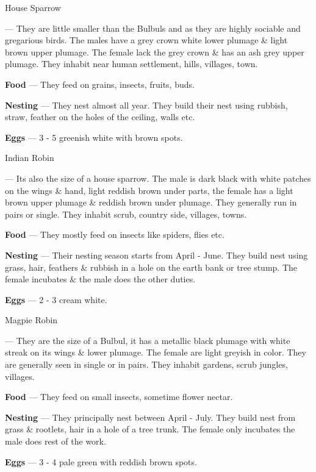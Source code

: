 \begin{bird}{House Sparrow}

 --- They are little smaller than the Bulbuls and as they are highly sociable and gregarious birds. The males have a grey crown white lower plumage \& light brown upper plumage. The female lack the grey crown \& has an ash grey upper plumage. They inhabit near human settlement, hills, villages, town. 

{\large\bf Food} --- They feed on grains, insects, fruits, buds.

{\large\bf Nesting} --- They nest almost all year. They build their nest using rubbish, straw, feather on the holes of the ceiling, walls etc.

{\large\bf Eggs} --- 3 - 5 greenish white with brown spots.
\end{bird}

\begin{bird}{Indian Robin}

 --- Its also the size of a house sparrow. The male is dark black with white patches on the wings \& hand, light reddish brown under parts, the female has a light brown upper plumage \& reddish brown under plumage. They generally run in pairs or single. They inhabit scrub, country side, villages, towns.

{\large\bf Food} --- They mostly feed on insects like spiders, flies etc.

{\large\bf Nesting} --- Their nesting season starts from April - June. They build nest using grass, hair, feathers  \& rubbish in a hole on the earth bank or tree stump. The female incubates \& the male does the other duties.

{\large\bf Eggs} --- 2 - 3 cream white.
\end{bird}

\begin{bird}{Magpie Robin}

 --- They are the size of a Bulbul, it has a metallic black plumage with white streak on its wings \& lower plumage. The female are light greyish in color. They are generally seen in single or in pairs. They inhabit gardens, scrub jungles, villages.

{\large\bf Food} --- They feed on small insects, sometime flower nectar.

{\large\bf Nesting} --- They principally nest between April - July. They build nest from grass \& rootlets, hair in a hole of a tree trunk. The female only incubates the male does rest of the work.

{\large\bf Eggs} --- 3 - 4 pale green with reddish brown spots.
\end{bird}

